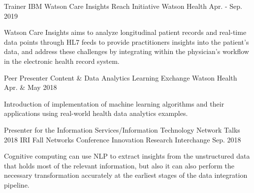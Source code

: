 

\begin{cventries}

  \cventry
    {Trainer} %
    {IBM Watson Care Insights Reach Initiative} %
    {Watson Health} %
    {Apr. - Sep. 2019} %
    {
      \begin{cvitems} %
        \item {Watson Care Insights aims to analyze longitudinal patient records and real-time data points through HL7 feeds to provide practitioners insights into the patient’s data, and address these challenges by integrating within the physician's workflow in the electronic health record system.}
      \end{cvitems}
    }

  \cventry
    {Peer Presenter} %
    {Content \& Data Analytics Learning Exchange} %
    {Watson Health} %
    {Apr. \& May 2018} %
    {
      \begin{cvitems} %
        \item {Introduction of implementation of machine learning algorithms and their applications using real-world health data analytics examples.}
      \end{cvitems}
    }

  \cventry
    {Presenter for the Information Services/Information Technology Network Talks} %
    {2018 IRI Fall Networks Conference} %
    {Innovation Research Interchange} %
    {Sep. 2018} %
    {
      \begin{cvitems} %
        \item {Cognitive computing can use NLP to extract insights from the unstructured data that holds most of the relevant information, but also it can also perform the necessary transformation accurately at the earliest stages of the data integration pipeline.}
      \end{cvitems}
    }


\end{cventries}
